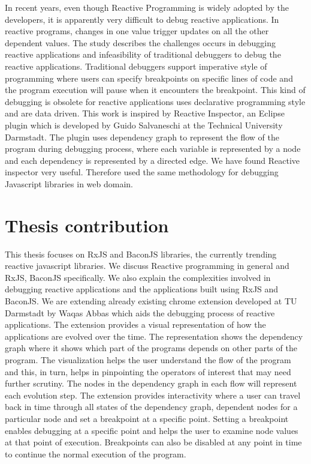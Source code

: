 In recent years, even though Reactive Programming is widely adopted by the developers, it is apparently very difficult to debug reactive applications. 
In reactive programs, changes in one value trigger updates on all the other dependent values. The study\cite{Salvaneschi:2016:DRP:2889160.2893174} describes the challenges occurs in debugging reactive applications and infeasibility of traditional debuggers to debug the reactive applications. Traditional debuggers support imperative style of programming where users can specify breakpoints on specific lines of code and the program execution will pause when it encounters the breakpoint. 
This kind of debugging is obsolete for reactive applications uses declarative programming style and are data driven. 
This work is inspired by Reactive Inspector\cite{reactiveInspector}, an Eclipse plugin which is developed by Guido Salvaneschi at the Technical University Darmstadt. 
The plugin uses dependency graph to represent the flow of the program during debugging process, where each variable is represented by a node and each dependency is represented by a directed edge.
We have found Reactive inspector very useful. Therefore used the same methodology for debugging Javascript libraries in web domain.

\section{Thesis contribution}

This thesis focuses on RxJS and BaconJS libraries, the currently trending reactive javascript libraries. 
We discuss Reactive programming in general and RxJS, BaconJS specifically.
We also explain the complexities involved in debugging reactive applications and the applications built using RxJS and BaconJS. 
We are extending already existing chrome extension developed at TU Darmstadt by Waqas Abbas\cite{cri} which aids the debugging process of reactive applications. 
The extension provides a visual representation of how the applications are evolved over the time. 
The representation shows the dependency graph where it shows which part of the programs depends on other parts of the program. 
The visualization helps the user understand the flow of the program and this, in turn, helps in pinpointing the operators of interest that may need further scrutiny. 
The nodes in the dependency graph in each flow will represent each evolution step. 
The extension provides interactivity where a user can travel back in time through all states of the dependency graph, dependent nodes for a particular node and set a breakpoint at a specific point. 
Setting a breakpoint enables debugging at a specific point and helps the user to examine node values at that point of execution. 
Breakpoints can also be disabled at any point in time to continue the normal execution of the program.



